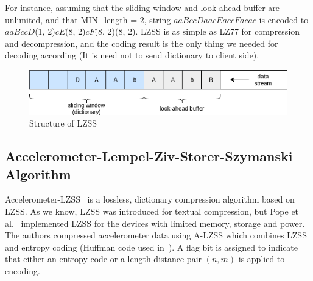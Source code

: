 For instance, assuming that the sliding window and look-ahead buffer are unlimited, and that MIN\_length = 2, 
 string $aaBccDaacEaccFacac$ is
encoded to $aaBccD$(1, 2)$cE$(8, 2)$cF$(8, 2)(8, 2). LZSS is as simple as LZ77 for compression
and decompression, and the coding result is the only thing we needed for decoding according (It is need not to send
dictionary to client side).

\begin{figure}
    \centering
    \includegraphics[width=\textwidth]{figures/LZSS.png}
    \caption{Structure of LZSS}
    \label{fig:LZSS}
\end{figure}

\subsection{Accelerometer-Lempel-Ziv-Storer-Szymanski Algorithm}
Accelerometer-LZSS~\cite{pope2018accelerometer} is a lossless, dictionary
compression algorithm based on LZSS. As we know, LZSS was introduced
for textual compression, but Pope et al.~\cite{pope2018accelerometer}
implemented LZSS for the devices with limited memory, storage and power. The
authors compressed accelerometer data using A-LZSS which combines LZSS and
entropy coding (Huffman code used in~\cite{pope2018accelerometer}). A flag bit is
assigned to indicate that either an entropy code or a length-distance pair $(n, m)$ is applied to encoding. 





